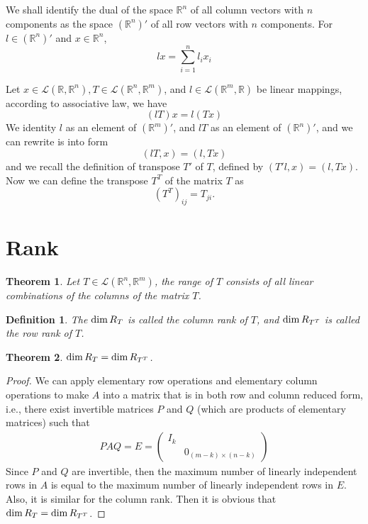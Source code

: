 \documentclass[11pt]{book}
\newtheorem{definition}{Definition}[section]
\newtheorem{theorem}{Theorem}[section]
\theoremstyle{definition}
\numberwithin{equation}{chapter}
\begin{document}
We shall identify the dual of the space $\mathbb{R}^n$ of all column vectors with $n$ components as the space $(\mathbb{R}^n)'$ of all row vectors with $n$ components. For $l\in (\mathbb{R}^n)'$ and $x\in\mathbb{R}^n$, 
$$l x = \sum^n_{i=1}l_ix_i$$

Let $x\in\mathscr{L}(\mathbb{R},\mathbb{R}^n), T \in \mathscr{L}(\mathbb{R}^n,\mathbb{R}^m)$, and $l \in \mathscr{L}(\mathbb{R}^m,\mathbb{R})$ be linear mappings, according to associative law, we have
$$(lT)x = l(Tx)$$
We identity $l$ as an element of $(\mathbb{R}^m)'$, and $lT$ as an element of $(\mathbb{R}^n)'$, and we can rewrite is into form
$$(lT, x) = (l, Tx)$$
and we recall the definition of transpose $T'$ of $T$, defined by $(T'l, x) = (l, Tx)$. Now we can define the transpose $T^T$ of the matrix $T$ as 
$$\left(T^T\right)_{ij} = T_{ji}.$$

\medskip

\section{Rank}
\begin{theorem}
Let $T\in\mathscr{L}(\mathbb{R}^n,\mathbb{R}^m)$, the range of $T$ consists of all linear combinations of the columns of the matrix $T$.
\end{theorem}

\medskip

\begin{definition}
The ${\rm dim}\, R_T$ is called the column rank of $T$, and ${\rm dim}\, R_{T^T}$ is called the row rank of $T$.
\end{definition}

\begin{theorem}
${\rm dim}\,R_T = {\rm dim}\, R_{T^T}$.
\end{theorem}
\begin{proof}
We can apply elementary row operations and elementary column operations to make $A$ into a matrix that is in both row and column reduced form, i.e., there exist invertible matrices $P$ and $Q$ (which are products of elementary matrices) such that
\begin{align*}
    PAQ = E = \left(
        \begin{matrix}
        I_{k} &  \\
         & 0_{(m-k)\times (n-k)}
        \end{matrix}
    \right)
\end{align*}
Since $P$ and $Q$ are invertible, then the maximum number of linearly independent rows in $A$ is equal to the maximum number of linearly independent rows in $E$. Also, it is similar for the column rank. Then it is obvious that ${\rm dim}\,R_T = {\rm dim}\, R_{T^T}$.
\end{proof}
\end{document}
